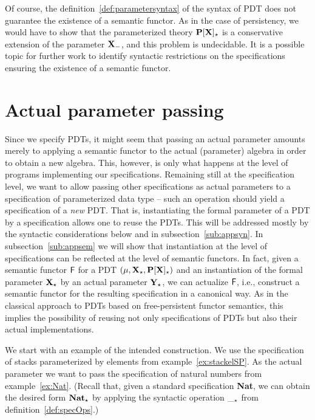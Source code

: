 Of course, the definition~\ref{def:parametersyntax} of the syntax of PDT does
not guarantee the existence of a semantic 
functor. As in the case of persistency, we would have to show that the
parameterized theory ${\bf P[X]_\star}$ is a conservative extension of the
parameter ${\bf X_-}$, and this problem is undecidable. It is a possible
topic for further work to identify syntactic restrictions on the
specifications ensuring the existence of a semantic functor.

\section{Actual parameter passing}\label{se:app}
Since we specify PDTs, it might seem that passing an
actual parameter amounts merely to applying a semantic functor to the actual (parameter)
algebra in order to obtain a new algebra. This, however, is only what happens
at the level of programs implementing our specifications. Remaining still at
the specification level, we want to allow passing other specifications as
actual parameters to a specification of parameterized data type -- 
such an operation should yield a specification of a {\em new} PDT.
That is, instantiating the formal parameter of a PDT 
by a specification allows one to reuse the PDTs. This will
be addressed mostly by the syntactic considerations below and in
subsection~\ref{sub:appsyn}. In subsection~\ref{sub:appsem} we will show that
instantiation at the level of specifications can be reflected at the level of
semantic functors. In fact, given a semantic functor ${\sf {F}}$ for a PDT $(\mu,{\bf X_\star},{\bf P[X]_\star})$ and
an instantiation of the formal parameter ${\bf X_\star}$ by an actual
parameter ${\bf Y_\star}$, we can actualize ${\sf {F}}$, i.e., construct a semantic functor for the
resulting specification in a canonical way. As in the classical approach to
PDTs based on free-persistent functor semantics, this implies the possibility of
reusing not only specifications of PDTs but also their actual implementations. 

We start with an example of the intended construction. We use
the specification of stacks parameterized by elements from example~\ref{ex:stackelSP}.
As the actual parameter we want to pass the specification of natural
numbers from example~\ref{ex:Nat}.
(Recall that, given a standard specification {\bf Nat}, we can obtain the
desired form ${\bf Nat}_\star$ by applying the syntactic operation $\__\star$
from definition~\ref{def:specOps}.)

